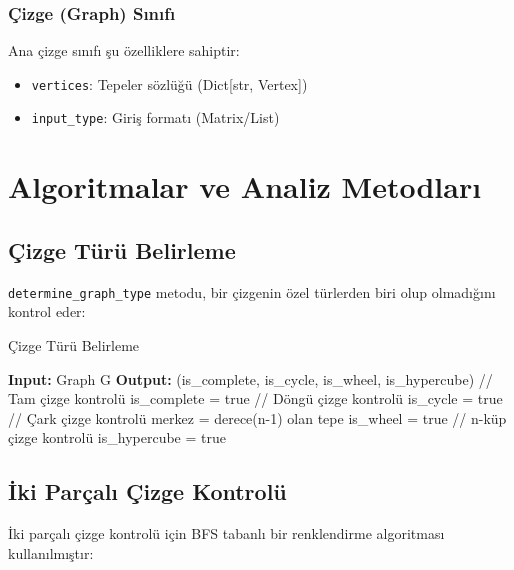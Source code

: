 \documentclass[12pt]{article}
\begin{document}
\subsubsection{Çizge (Graph) Sınıfı}
Ana çizge sınıfı şu özelliklere sahiptir:
\begin{itemize}
    \item \texttt{vertices}: Tepeler sözlüğü (Dict[str, Vertex])
    \item \texttt{input\_type}: Giriş formatı (Matrix/List)
\end{itemize}

\section{Algoritmalar ve Analiz Metodları}

\subsection{Çizge Türü Belirleme}
\texttt{determine\_graph\_type} metodu, bir çizgenin özel türlerden biri olup olmadığını kontrol eder:

\begin{algorithm}
\caption{Çizge Türü Belirleme}
\begin{algorithmic}
\STATE \textbf{Input:} Graph G
\STATE \textbf{Output:} (is\_complete, is\_cycle, is\_wheel, is\_hypercube)
\STATE
\STATE // Tam çizge kontrolü
    \STATE is\_complete = true
\ENDIF
\STATE
\STATE // Döngü çizge kontrolü
    \STATE is\_cycle = true
\ENDIF
\STATE
\STATE // Çark çizge kontrolü
    \STATE merkez = derece(n-1) olan tepe
        \STATE is\_wheel = true
    \ENDIF
\ENDIF
\STATE
\STATE // n-küp çizge kontrolü
    \STATE is\_hypercube = true
\ENDIF
\end{algorithmic}
\end{algorithm}

\subsection{İki Parçalı Çizge Kontrolü}
İki parçalı çizge kontrolü için BFS tabanlı bir renklendirme algoritması kullanılmıştır:
\end{document}
